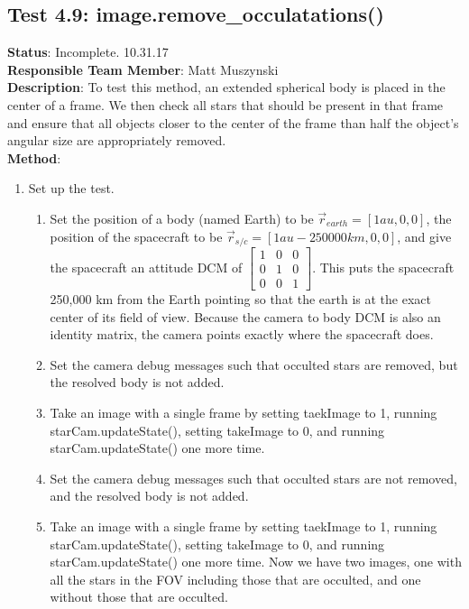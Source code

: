 \documentclass[]{DINOReportMemo}
\begin{document}
\subsection{Test 4.9: image.remove\_occulatations()}
\textbf{Status}: Incomplete. 10.31.17\\
\textbf{Responsible Team Member}: Matt Muszynski \\
\textbf{Description}: To test this method, an extended spherical body is placed in the center of a frame. We then check all stars that should be present in that frame and ensure that all objects closer to the center of the frame than half the object's angular size are appropriately removed.\\
\textbf{Method}: 
\begin{enumerate}
    \item Set up the test.
    \begin{enumerate}
        \item Set the position of a body (named Earth) to be $\vec{r}_{earth} = [1 au, 0, 0]$, the position of the spacecraft to be $\vec{r}_{s/c} = [1 au - 250000 km, 0, 0]$, and give the spacecraft an attitude DCM of $
        \begin{bmatrix}
        1 & 0 & 0 \\ 0 & 1 & 0 \\ 0 & 0 & 1
        \end{bmatrix}$. This puts the spacecraft 250,000 km from the Earth pointing so that the earth is at the exact center of its field of view. Because the camera to body DCM is also an identity matrix, the camera points exactly where the spacecraft does.
        \item Set the camera debug messages such that occulted stars are removed, but the resolved body is not added.
        \item Take an image with a single frame by setting taekImage to 1, running starCam.updateState(), setting takeImage to 0, and running starCam.updateState() one more time.
        \item Set the camera debug messages such that occulted stars are not removed, and the resolved body is not added.
        \item Take an image with a single frame by setting taekImage to 1, running starCam.updateState(), setting takeImage to 0, and running starCam.updateState() one more time. Now we have two images, one with all the stars in the FOV including those that are occulted, and one without those that are occulted.
    \end{enumerate}

\end{enumerate}
\end{document}
